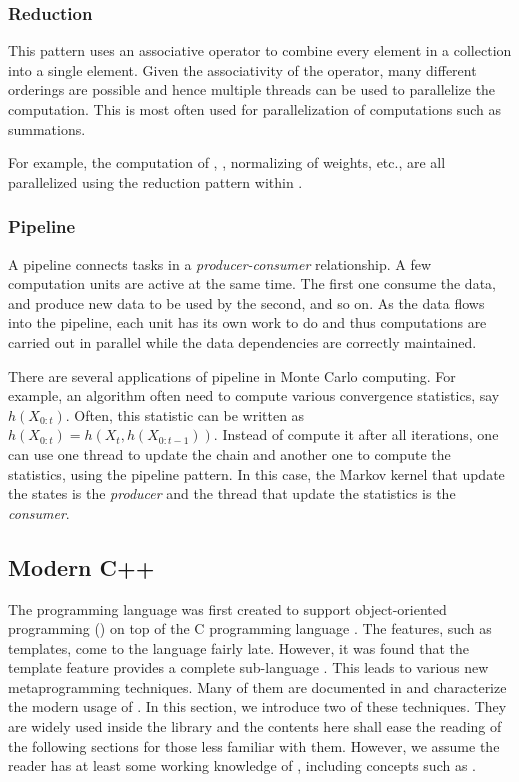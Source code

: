 \subsubsection{Reduction}
\label{ssub:Reduction}

This pattern uses an associative operator to combine every element in a
collection into a single element. Given the associativity of the operator,
many different orderings are possible and hence multiple threads can be used
to parallelize the computation. This is most often used for parallelization of
computations such as summations.

For example, the computation of \ess, \cess, normalizing of weights, etc., are
all parallelized using the reduction pattern within \vsmc.

\subsubsection{Pipeline}
\label{ssub:Pipeline}

A pipeline connects tasks in a \emph{producer-consumer} relationship. A few
computation units are active at the same time. The first one consume the data,
and produce new data to be used by the second, and so on. As the data flows
into the pipeline, each unit has its own work to do and thus computations are
carried out in parallel while the data dependencies are correctly maintained.

There are several applications of pipeline in Monte Carlo computing. For
example, an \mcmc algorithm often need to compute various convergence
statistics, say $h(X_{0:t})$. Often, this statistic can be written as
$h(X_{0:t}) = h(X_t, h(X_{0:{t-1}}))$. Instead of compute it after all
iterations, one can use one thread to update the \mcmc chain and another one
to compute the statistics, using the pipeline pattern. In this case, the
Markov kernel that update the states is the \emph{producer} and the thread
that update the statistics is the \emph{consumer}.

\subsection{Modern C++}
\label{sub:Modern C++}

The \cpp programming language \cite{cpp03} was first created to support
object-oriented programming (\oop) on top of the C programming language
\cite{evolutioncpp}.  The features, such as templates, come to the language
fairly late. However, it was found that the \cpp template feature provides a
complete sub-language \cite{cpptemplateturing}. This leads to various new
metaprogramming techniques. Many of them are documented in \cite{moderncpp}
and characterize the modern usage of \cpp. In this section, we introduce two
of these techniques. They are widely used inside the \vsmc library and the
contents here shall ease the reading of the following sections for those less
familiar with them. However, we assume the reader has at least some working
knowledge of \cpp, including concepts such as \oop.

